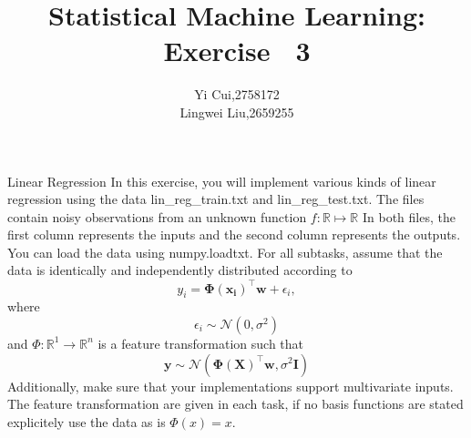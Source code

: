 \documentclass[
	ngerman,
     solution=true
	]{tudaexercise}
\begin{document}
\title[Übung TUDaExercise]{Statistical Machine Learning:\\Exercise$\quad$3}
\author{Yi Cui,2758172\\ Lingwei Liu,2659255}

\maketitle

\begin{task}{Linear Regression}
In this exercise, you will implement various kinds of linear regression using the data lin\_reg\_train.txt and
 lin\_reg\_test.txt. The files contain noisy observations from an unknown function $ f: \mathbb{R} \mapsto \mathbb{R}$ In both files,
the first column represents the inputs and the second column represents the outputs. You can load the data using
numpy.loadtxt.
For all subtasks, assume that the data is identically and independently distributed according to
\[
y_{i}=\boldsymbol{\Phi}\left(\mathbf{x}_{\mathbf{i}}\right)^{\top} \mathbf{w}+\epsilon_{i} ,
\]
where
\[
\epsilon_{i} \sim \mathcal{N}\left(0, \sigma^{2}\right)
\]
and $ \Phi: \mathbb{R}^{1} \rightarrow \mathbb{R}^{n}$ is a feature transformation such that
\[
\mathbf{y} \sim \mathcal{N}\left(\mathbf{\Phi}(\mathbf{X})^{\top} \mathbf{w}, \sigma^{2} \mathbf{I}\right)
\]
Additionally, make sure that your implementations support multivariate inputs. The feature transformation are given
in each task, if no basis functions are stated explicitely use the data as is $\Phi(x) = x$.



\end{task}
\end{document}
